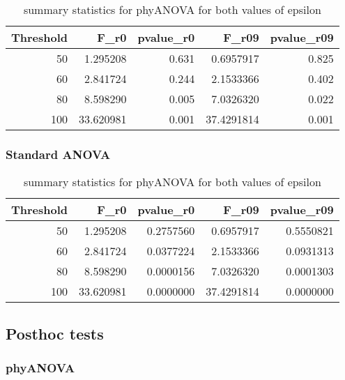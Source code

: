 \documentclass[]{article}
\begin{document}
\begin{table}[H]

\caption{\label{tab:unnamed-chunk-17}summary statistics for phyANOVA for both values of epsilon}
\centering
\begin{tabular}{r|r|r|r|r}
\hline
Threshold & F\_r0 & pvalue\_r0 & F\_r09 & pvalue\_r09\\
\hline
50 & 1.295208 & 0.631 & 0.6957917 & 0.825\\
\hline
60 & 2.841724 & 0.244 & 2.1533366 & 0.402\\
\hline
80 & 8.598290 & 0.005 & 7.0326320 & 0.022\\
\hline
100 & 33.620981 & 0.001 & 37.4291814 & 0.001\\
\hline
\end{tabular}
\end{table}

\hypertarget{standard-anova-2}{%
\subsubsection{Standard ANOVA}\label{standard-anova-2}}

\begin{table}[H]

\caption{\label{tab:unnamed-chunk-18}summary statistics for phyANOVA for both values of epsilon}
\centering
\begin{tabular}{r|r|r|r|r}
\hline
Threshold & F\_r0 & pvalue\_r0 & F\_r09 & pvalue\_r09\\
\hline
50 & 1.295208 & 0.2757560 & 0.6957917 & 0.5550821\\
\hline
60 & 2.841724 & 0.0377224 & 2.1533366 & 0.0931313\\
\hline
80 & 8.598290 & 0.0000156 & 7.0326320 & 0.0001303\\
\hline
100 & 33.620981 & 0.0000000 & 37.4291814 & 0.0000000\\
\hline
\end{tabular}
\end{table}

\hypertarget{posthoc-tests-1}{%
\subsection{Posthoc tests}\label{posthoc-tests-1}}

\hypertarget{phyanova-3}{%
\subsubsection{phyANOVA}\label{phyanova-3}}
\end{document}
